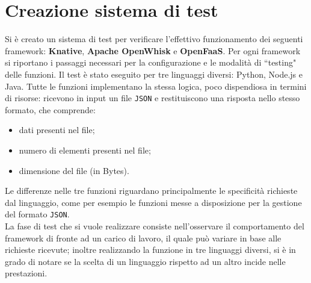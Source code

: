 \documentclass[12pt,a4paper,openany,twoside]{book}
\begin{document}
\chapter{Creazione sistema di test}
\label{chap:creazione-sistema-test}

Si è creato un sistema di test per verificare l'effettivo funzionamento dei seguenti framework: \textbf{Knative}, \textbf{Apache OpenWhisk} e \textbf{OpenFaaS}. Per ogni framework si riportano i passaggi necessari per la configurazione e le modalità di ``testing" delle funzioni.
Il test è stato eseguito per tre linguaggi diversi: Python, Node.js e Java. Tutte le funzioni implementano la stessa logica, poco dispendiosa in termini di risorse: ricevono in input un file \texttt{JSON} e restituiscono una risposta nello stesso formato, che comprende:
\begin{itemize}
    \item dati presenti nel file;
    
    \item numero di elementi presenti nel file;
    
    \item dimensione del file (in Bytes).
\end{itemize}
Le differenze nelle tre funzioni riguardano principalmente le specificità richieste dal linguaggio, come per esempio le funzioni messe a disposizione per la gestione del formato \texttt{JSON}.
\\
La fase di test che si vuole realizzare consiste nell'osservare il comportamento del framework di fronte ad un carico di lavoro, il quale può variare in base alle richieste ricevute; inoltre realizzando la funzione in tre linguaggi diversi, si è in grado di notare se la scelta di un linguaggio rispetto ad un altro incide nelle prestazioni.
\end{document}
